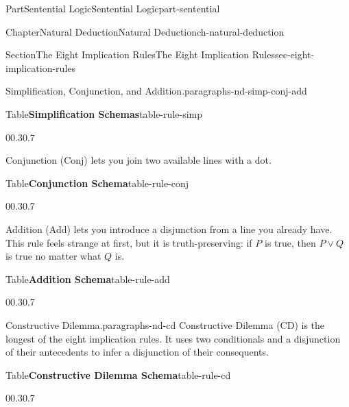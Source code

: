 \documentclass[oneside,10pt,]{book}
\newcommand{\tabularfont}{\relax}
\newcommand{\terminology}[1]{\textbf{#1}}
\newcommand{\hrulemedium}{\noalign{\hrule height 0.07em}}
\renewcommand{\terminology}[1]{#1}
\begin{document}
\begin{partptx}{Part}{Sentential Logic}{}{Sentential Logic}{}{}{part-sentential}
\begin{chapterptx}{Chapter}{Natural Deduction}{}{Natural Deduction}{}{}{ch-natural-deduction}
\begin{sectionptx}{Section}{The Eight Implication Rules}{}{The Eight Implication Rules}{}{}{sec-eight-implication-rules}
\begin{paragraphs}{Simplification, Conjunction, and Addition.}{paragraphs-nd-simp-conj-add}
\begin{tableptx}{Table}{\textbf{Simplification Schemas}}{table-rule-simp}{}
\begin{tabularbox}{0}{0.3}{0.7}
\end{tabularbox}%
\end{tableptx}%
\terminology{Conjunction} (Conj) lets you join two available lines with a dot.%
\begin{tableptx}{Table}{\textbf{Conjunction Schema}}{table-rule-conj}{}%
\begin{tabularbox}{0}{0.3}{0.7}%
\resizebox{\ifdim\width > \linewidth\linewidth\else\width\fi}{!}{%
{\tabularfont%
\begin{tabular}{c}
\(\mathcal{A}\)\tabularnewline[0pt]
\(\mathcal{B}\)\tabularnewline\hrulemedium
\(\mathcal{A} \cdot \mathcal{B}\)
\end{tabular}
}%
}%
\end{tabularbox}%
\end{tableptx}%
\terminology{Addition} (Add) lets you introduce a disjunction from a line you already have. This rule feels strange at first, but it is truth-preserving: if \(P\) is true, then \(P \lor Q\) is true no matter what \(Q\) is.%
\begin{tableptx}{Table}{\textbf{Addition Schema}}{table-rule-add}{}%
\begin{tabularbox}{0}{0.3}{0.7}%
\resizebox{\ifdim\width > \linewidth\linewidth\else\width\fi}{!}{%
{\tabularfont%
\begin{tabular}{c}
\(\mathcal{A}\)\tabularnewline\hrulemedium
\(\mathcal{A} \lor \mathcal{B}\)
\end{tabular}
}%
}%
\end{tabularbox}%
\end{tableptx}%
\end{paragraphs}%
\begin{paragraphs}{Constructive Dilemma.}{paragraphs-nd-cd}%
\terminology{Constructive Dilemma} (CD) is the longest of the eight implication rules. It uses two conditionals and a disjunction of their antecedents to infer a disjunction of their consequents.%
\begin{tableptx}{Table}{\textbf{Constructive Dilemma Schema}}{table-rule-cd}{}%
\begin{tabularbox}{0}{0.3}{0.7}%
\resizebox{\ifdim\width > \linewidth\linewidth\else\width\fi}{!}{%
{\tabularfont%
\begin{tabular}{c}
\(\mathcal{A} \supset \mathcal{B}\)\tabularnewline[0pt]
\(\mathcal{C} \supset \mathcal{D}\)\tabularnewline[0pt]

\end{tabular}}}
\end{tabularbox}
\end{tableptx}
\end{paragraphs}
\end{sectionptx}
\end{chapterptx}
\end{partptx}
\end{document}
